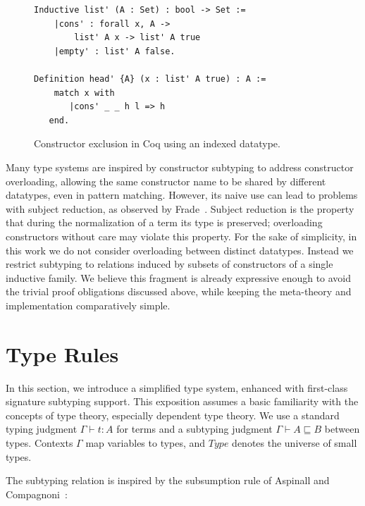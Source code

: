 \documentclass[a4paper, anonymous, UKenglish,cleveref, autoref, thm-restate]{lipics-v2021}
\begin{document}
\begin{figure}
\begin{lstlisting}[language=Coq]
Inductive list' (A : Set) : bool -> Set :=
    |cons' : forall x, A -> 
        list' A x -> list' A true
    |empty' : list' A false.

Definition head' {A} (x : list' A true) : A := 
    match x with
       |cons' _ _ h l => h
   end.
\end{lstlisting}
\caption{Constructor exclusion in Coq using an indexed datatype.}
\label{fig:coq-indexed}
\end{figure}

Many type systems are inspired by constructor subtyping to address constructor overloading, allowing the same constructor name to be shared by different datatypes, even in pattern matching. However, its naive use can lead to problems with subject reduction, as observed by Frade~\cite{mariaJoaoFrade}. Subject reduction is the property that during the normalization of a term its type is preserved; overloading constructors without care may violate this property. For the sake of simplicity, in this work we do not consider overloading between distinct datatypes. Instead we restrict subtyping to relations induced by subsets of constructors of a single inductive family. We believe this fragment is already expressive enough to avoid the trivial proof obligations discussed above, while keeping the meta-theory and implementation comparatively simple.

\section{Type Rules}
\label{sec:rules}
In this section, we introduce a simplified type system, enhanced with first-class signature subtyping support. This exposition assumes a basic familiarity with the concepts of type theory, especially dependent type theory. We use a standard typing judgment $\Gamma \vdash t : A$ for terms and a subtyping judgment $\Gamma \vdash A \sqsubseteq B$ between types. Contexts $\Gamma$ map variables to types, and $Type$ denotes the universe of small types.

The subtyping relation is inspired by the subsumption rule of Aspinall and Compagnoni~\cite{AspinallCompagnoni}:
\begin{center}
\begin{mathpar}
\end{mathpar}
\end{center}
\end{document}
